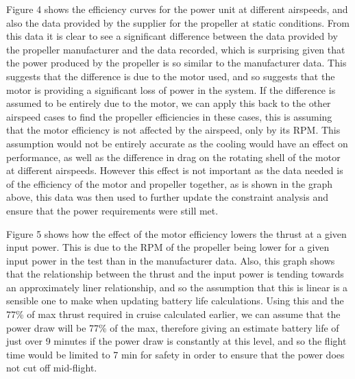 \documentclass[../../main.tex]{subfiles}
\begin{document}

Figure 4 shows the efficiency curves for the power unit at different airspeeds, and also the data provided by the supplier for the propeller at static conditions.
From this data it is clear to see a significant difference between the data provided by the propeller manufacturer and the data recorded, which is surprising given that the power produced by the propeller is so similar to the manufacturer data.
This suggests that the difference is due to the motor used, and so suggests that the motor is providing a significant loss of power in the system.
If the difference is assumed to be entirely due to the motor, we can apply this back to the other airspeed cases to find the propeller efficiencies in these cases, this is assuming that the motor efficiency is not affected by the airspeed, only by its RPM.
This assumption would not be entirely accurate as the cooling would have an effect on performance, as well as the difference in drag on the rotating shell of the motor at different airspeeds.
However this effect is not important as the data needed is of the efficiency of the motor and propeller together, as is shown in the graph above, this data was then used to further update the constraint analysis and ensure that the power requirements were still met. 


Figure 5 shows how the effect of the motor efficiency lowers the thrust at a given input power.
This is due to the RPM of the propeller being lower for a given input power in the test than in the manufacturer data.
Also, this graph shows that the relationship between the thrust and the input power is tending towards an approximately liner relationship, and so the assumption that this is linear is a sensible one to make when updating battery life calculations.
Using this and the 77\% of max thrust required in cruise calculated earlier, we can assume that the power draw will be 77\% of the max, therefore giving an estimate battery life of just over 9 minutes if the power draw is constantly at this level, and so the flight time would be limited to 7 min for safety in order to ensure that the power does not cut off mid-flight. 
\end{document}
